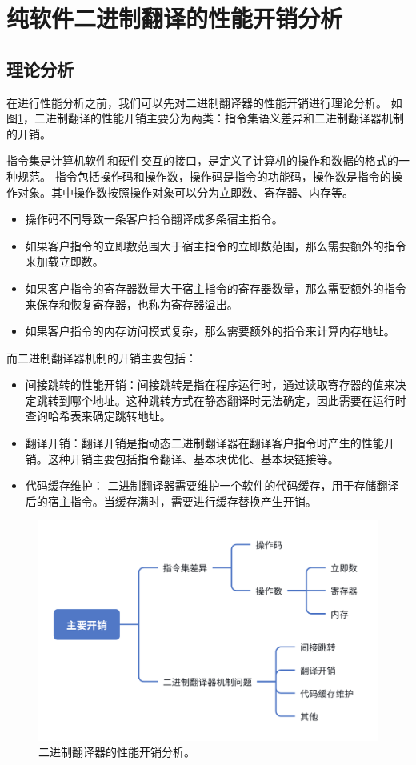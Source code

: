 \section{纯软件二进制翻译的性能开销分析}\label{sec:bt_overhead_all}

\subsection{理论分析}\label{sec:bt_overhead}

在进行性能分析之前，我们可以先对二进制翻译器的性能开销进行理论分析。
如图\ref{img:bt_overhead}，二进制翻译的性能开销主要分为两类：指令集语义差异和二进制翻译器机制的开销。

指令集是计算机软件和硬件交互的接口，是定义了计算机的操作和数据的格式的一种规范。
指令包括操作码和操作数，操作码是指令的功能码，操作数是指令的操作对象。其中操作数按照操作对象可以分为立即数、寄存器、内存等。
\begin{itemize}
\item 操作码不同导致一条客户指令翻译成多条宿主指令。
\item 如果客户指令的立即数范围大于宿主指令的立即数范围，那么需要额外的指令来加载立即数。
\item 如果客户指令的寄存器数量大于宿主指令的寄存器数量，那么需要额外的指令来保存和恢复寄存器，也称为寄存器溢出。
\item 如果客户指令的内存访问模式复杂，那么需要额外的指令来计算内存地址。
\end{itemize}

而二进制翻译器机制的开销主要包括：
\begin{itemize}
\item 间接跳转的性能开销：间接跳转是指在程序运行时，通过读取寄存器的值来决定跳转到哪个地址。这种跳转方式在静态翻译时无法确定，因此需要在运行时查询哈希表来确定跳转地址。
\item 翻译开销：翻译开销是指动态二进制翻译器在翻译客户指令时产生的性能开销。这种开销主要包括指令翻译、基本块优化、基本块链接等。
\item 代码缓存维护： 二进制翻译器需要维护一个软件的代码缓存，用于存储翻译后的宿主指令。当缓存满时，需要进行缓存替换产生开销。
\end{itemize}


\begin{figure}[!htbp]
  \centering
  \includegraphics[width=0.8\linewidth]{./feishuImage/overhead.png}
  \caption{二进制翻译器的性能开销分析。}
  \label{img:bt_overhead}
\end{figure}

